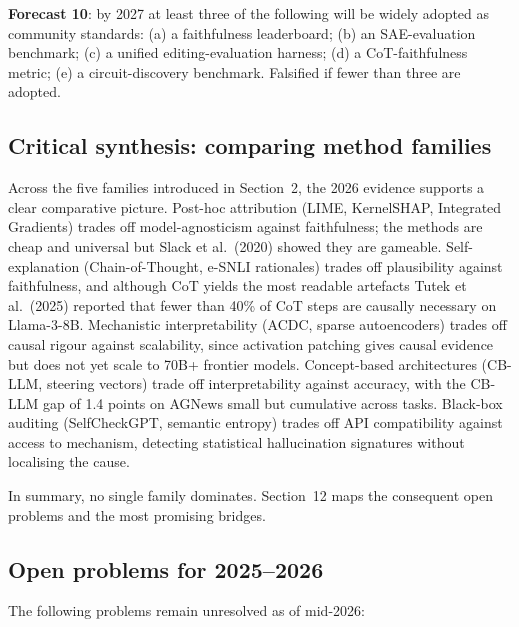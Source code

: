 \textbf{Forecast 10}: by 2027 at least three of the following will be widely adopted as community standards: (a) a faithfulness leaderboard; (b) an SAE-evaluation benchmark; (c) a unified editing-evaluation harness; (d) a CoT-faithfulness metric; (e) a circuit-discovery benchmark. Falsified if fewer than three are adopted.

\subsection{Critical synthesis: comparing method families}\label{critical-synthesis-comparing-method-families}

Across the five families introduced in Section~2, the 2026 evidence supports a clear comparative picture. Post-hoc attribution (LIME, KernelSHAP, Integrated Gradients) trades off model-agnosticism against faithfulness; the methods are cheap and universal but Slack et al.~(2020) showed they are gameable. Self-explanation (Chain-of-Thought, e-SNLI rationales) trades off plausibility against faithfulness, and although CoT yields the most readable artefacts Tutek et al.~(2025) reported that fewer than 40\% of CoT steps are causally necessary on Llama-3-8B. Mechanistic interpretability (ACDC, sparse autoencoders) trades off causal rigour against scalability, since activation patching gives causal evidence but does not yet scale to 70B+ frontier models. Concept-based architectures (CB-LLM, steering vectors) trade off interpretability against accuracy, with the CB-LLM gap of 1.4 points on AGNews small but cumulative across tasks. Black-box auditing (SelfCheckGPT, semantic entropy) trades off API compatibility against access to mechanism, detecting statistical hallucination signatures without localising the cause.

In summary, no single family dominates. Section~12 maps the consequent open problems and the most promising bridges.

\subsection{Open problems for 2025--2026}\label{open-problems-for-20252026}

The following problems remain unresolved as of mid-2026:

